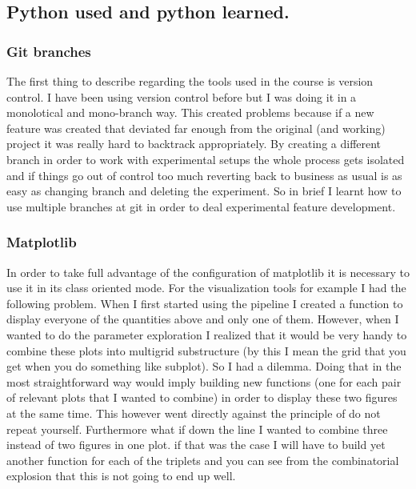 \documentclass[11pt,a4paper]{article}
\begin{document}
\subsection{Python used and python
learned.}\label{python-used-and-python-learned.}

\subsubsection{Git branches}\label{git-branches}

The first thing to describe regarding the tools used in the course is
version control. I have been using version control before but I was
doing it in a monolotical and mono-branch way. This created problems
because if a new feature was created that deviated far enough from the
original (and working) project it was really hard to backtrack
appropriately. By creating a different branch in order to work with
experimental setups the whole process gets isolated and if things go out
of control too much reverting back to business as usual is as easy as
changing branch and deleting the experiment. So in brief I learnt how to
use multiple branches at git in order to deal experimental feature
development.

\subsubsection{Matplotlib}\label{matplotlib}

In order to take full advantage of the configuration of matplotlib it is
necessary to use it in its class oriented mode. For the visualization
tools for example I had the following problem. When I first started
using the pipeline I created a function to display everyone of the
quantities above and only one of them. However, when I wanted to do the
parameter exploration I realized that it would be very handy to combine
these plots into multigrid substructure (by this I mean the grid that
you get when you do something like subplot). So I had a dilemma. Doing
that in the most straightforward way would imply building new functions
(one for each pair of relevant plots that I wanted to combine) in order
to display these two figures at the same time. This however went
directly against the principle of do not repeat yourself. Furthermore
what if down the line I wanted to combine three instead of two figures
in one plot. if that was the case I will have to build yet another
function for each of the triplets and you can see from the combinatorial
explosion that this is not going to end up well.
\end{document}
